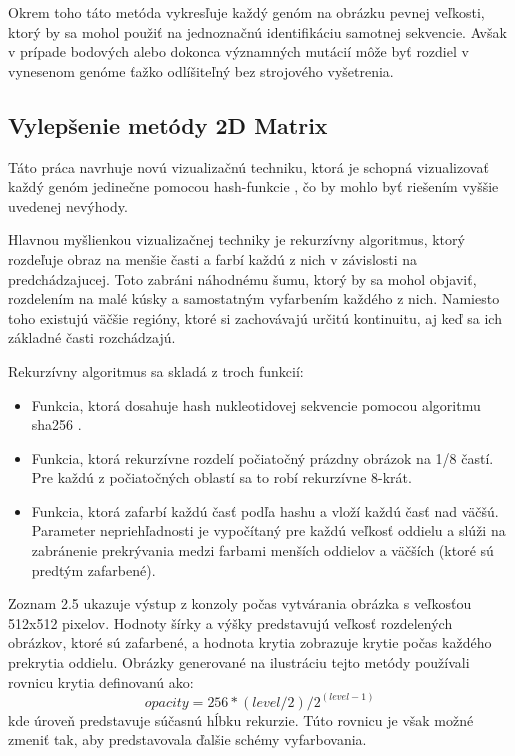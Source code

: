 Okrem toho táto metóda vykresľuje každý genóm na obrázku pevnej veľkosti, ktorý by sa mohol použiť na jednoznačnú identifikáciu samotnej sekvencie.
Avšak v prípade bodových alebo dokonca významných mutácií môže byť rozdiel v vynesenom genóme ťažko odlíšiteľný bez strojového vyšetrenia.

\subsection{Vylepšenie metódy 2D Matrix}
Táto práca navrhuje novú vizualizačnú techniku, ktorá je schopná vizualizovať každý genóm jedinečne pomocou hash-funkcie \cite{hash}, čo by mohlo byť riešením vyššie uvedenej nevýhody.

Hlavnou myšlienkou vizualizačnej techniky je rekurzívny algoritmus, ktorý rozdeľuje obraz na menšie časti a farbí každú z nich v závislosti na predchádzajucej.
Toto zabráni náhodnému šumu, ktorý by sa mohol objaviť, rozdelením na malé kúsky a samostatným vyfarbením každého z nich.
Namiesto toho existujú väčšie regióny, ktoré si zachovávajú určitú kontinuitu, aj keď sa ich základné časti rozchádzajú.

Rekurzívny algoritmus sa skladá z troch funkcií:
\begin{itemize}
    \item Funkcia, ktorá dosahuje hash nukleotidovej sekvencie pomocou algoritmu sha256 \cite{hash2}.
    \item Funkcia, ktorá rekurzívne rozdelí počiatočný prázdny obrázok na 1/8 častí.
    Pre každú z počiatočných oblastí sa to robí rekurzívne 8-krát.
    \item Funkcia, ktorá zafarbí každú časť podľa hashu a vloží každú časť nad väčšú.
    Parameter nepriehľadnosti je vypočítaný pre každú veľkosť oddielu a slúži na zabránenie prekrývania medzi farbami menších oddielov a väčších (ktoré sú predtým zafarbené).
\end{itemize}

Zoznam 2.5 ukazuje výstup z konzoly počas vytvárania obrázka s veľkosťou 512x512 pixelov.
Hodnoty šírky a výšky predstavujú veľkosť rozdelených obrázkov, ktoré sú zafarbené, a hodnota krytia zobrazuje krytie počas každého prekrytia oddielu.
Obrázky generované na ilustráciu tejto metódy používali rovnicu krytia definovanú ako:\\
\[opacity = 256 * (level / 2) / 2 ^ {(level - 1)}\]
kde úroveň predstavuje súčasnú hĺbku rekurzie. 
Túto rovnicu je však možné zmeniť tak, aby predstavovala ďalšie schémy vyfarbovania.

